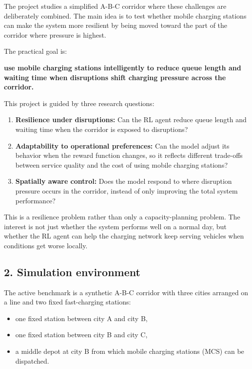\documentclass[11pt]{article}
\providecommand{\tightlist}{%
      \setlength{\itemsep}{0pt}\setlength{\parskip}{0pt}}
\begin{document}
The project studies a simplified A-B-C corridor where these challenges
are deliberately combined. The main idea is to test whether mobile
charging stations can make the system more resilient by being moved
toward the part of the corridor where pressure is highest.

The practical goal is:

\textbf{use mobile charging stations intelligently to reduce queue
length and waiting time when disruptions shift charging pressure across
the corridor.}

This project is guided by three research questions:

\begin{enumerate}
\def\labelenumi{\arabic{enumi}.}
\item
  \textbf{Resilience under disruptions:} Can the RL agent reduce queue
  length and waiting time when the corridor is exposed to disruptions?
\item
  \textbf{Adaptability to operational preferences:} Can the model adjust
  its behavior when the reward function changes, so it reflects
  different trade-offs between service quality and the cost of using
  mobile charging stations?
\item
  \textbf{Spatially aware control:} Does the model respond to where
  disruption pressure occurs in the corridor, instead of only improving
  the total system performance?
\end{enumerate}

This is a resilience problem rather than only a capacity-planning
problem. The interest is not just whether the system performs well on a
normal day, but whether the RL agent can help the charging network keep
serving vehicles when conditions get worse locally.

    \subsection{2. Simulation environment}\label{simulation-environment}

The active benchmark is a synthetic A-B-C corridor with three cities
arranged on a line and two fixed fast-charging stations:

\begin{itemize}
\tightlist
\item
  one fixed station between city A and city B,
\item
  one fixed station between city B and city C,
\item
  a middle depot at city B from which mobile charging stations (MCS) can
  be dispatched.
\end{itemize}
\end{document}
